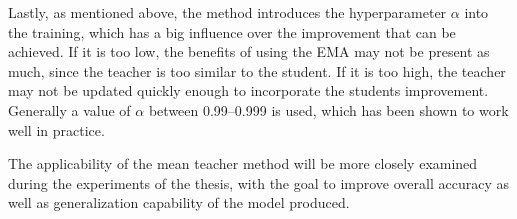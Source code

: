 Lastly, as mentioned above, the method introduces the hyperparameter $\alpha$ into the training, which has a big influence over the improvement that can be achieved. If it is too low, the benefits of using the EMA may not be present as much, since the teacher is too similar to the student. If it is too high, the teacher may not be updated quickly enough to incorporate the students improvement. 
Generally a value of $\alpha$ between \numrange{0.99}{0.999} is used, which has been shown to work well in practice.

The applicability of the mean teacher method will be more closely examined during the experiments of the thesis, with the goal to improve overall accuracy as well as generalization capability of the model produced. 